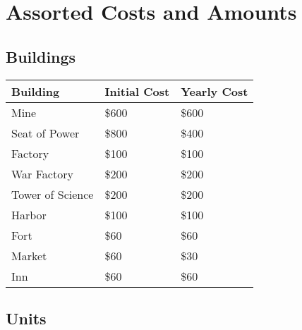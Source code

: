 
\chapter{Assorted Costs and Amounts}

\section{Buildings}

\begin{tabular}{ | p{4cm} | p{4cm} | p{4cm} |}
	\hline
	Building	& Initial Cost & Yearly Cost \\ \hline
Mine	& \$600 & \$600 \\ \hline
Seat of Power	& \$800 & \$400 \\ \hline
Factory	& \$100 & \$100 \\ \hline
War Factory	& \$200 & \$200 \\ \hline
Tower of Science	& \$200 & \$200 \\ \hline
Harbor	& \$100 &\$100  \\ \hline
Fort	& \$60 & \$60 \\ \hline
Market	& \$60 & \$30 \\ \hline
Inn	& \$60 & \$60 \\ \hline
\hline
\end{tabular}	

\section{Units}

